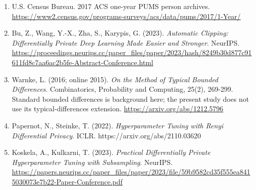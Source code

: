 \documentclass[
  10pt,
]{article}
\begin{document}
\begin{enumerate}
  \emph{Brownian Noise Reduction: Maximizing Privacy Subject to Accuracy
  Constraints}. NeurIPS. https://arxiv.org/abs/2206.07234
\item
  U.S. Census Bureau. 2017 ACS one-year PUMS person archives.
  \url{https://www2.census.gov/programs-surveys/acs/data/pums/2017/1-Year/}
\item
  Bu, Z., Wang, Y.-X., Zha, S., Karypis, G. (2023). \emph{Automatic
  Clipping: Differentially Private Deep Learning Made Easier and
  Stronger}. NeurIPS.
  \url{https://proceedings.neurips.cc/paper_files/paper/2023/hash/8249b30d877c91611fd8c7aa6ac2b5fe-Abstract-Conference.html}
\item
  Warnke, L. (2016; online 2015). \emph{On the Method of Typical Bounded
  Differences}. Combinatorics, Probability and Computing, 25(2),
  269-299. Standard bounded differences is background here; the present
  study does not use its typical-differences extension.
  \url{https://arxiv.org/abs/1212.5796}
\item
  Papernot, N., Steinke, T. (2022). \emph{Hyperparameter Tuning with
  Renyi Differential Privacy}. ICLR. https://arxiv.org/abs/2110.03620
\item
  Koskela, A., Kulkarni, T. (2023). \emph{Practical Differentially
  Private Hyperparameter Tuning with Subsampling}. NeurIPS.
  \url{https://papers.neurips.cc/paper_files/paper/2023/file/59b9582cd35f555ea8415030073e7b22-Paper-Conference.pdf}
\end{enumerate}
\end{document}
